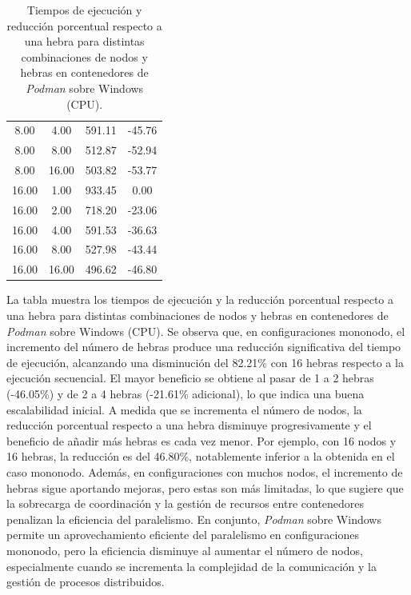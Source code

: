 \begin{table}[ht]
\begin{tabular}{|c|c|c|c|}
        8.00           & 4.00            & 591.11              & -45.76                         \\
        8.00           & 8.00            & 512.87              & -52.94                         \\
        8.00           & 16.00           & 503.82              & -53.77                         \\
        16.00          & 1.00            & 933.45              & 0.00                           \\
        16.00          & 2.00            & 718.20              & -23.06                         \\
        16.00          & 4.00            & 591.53              & -36.63                         \\
        16.00          & 8.00            & 527.98              & -43.44                         \\
        16.00          & 16.00           & 496.62              & -46.80                         \\
        \hline
    \end{tabular}
    \caption{Tiempos de ejecución y reducción porcentual respecto a una hebra para distintas combinaciones de nodos y hebras en contenedores de \textit{Podman} sobre Windows (CPU).}
    \label{tab:thread_sweep_windows_\textit{Podman}_time}
\end{table}

La tabla muestra los tiempos de ejecución y la reducción porcentual respecto a una hebra para distintas combinaciones de nodos y hebras en contenedores de \textit{Podman} sobre Windows (CPU). Se observa que, en configuraciones mononodo, el incremento del número de hebras produce una reducción significativa del tiempo de ejecución, alcanzando una disminución del 82.21\% con 16 hebras respecto a la ejecución secuencial. El mayor beneficio se obtiene al pasar de 1 a 2 hebras (-46.05\%) y de 2 a 4 hebras (-21.61\% adicional), lo que indica una buena escalabilidad inicial. A medida que se incrementa el número de nodos, la reducción porcentual respecto a una hebra disminuye progresivamente y el beneficio de añadir más hebras es cada vez menor. Por ejemplo, con 16 nodos y 16 hebras, la reducción es del 46.80\%, notablemente inferior a la obtenida en el caso mononodo. Además, en configuraciones con muchos nodos, el incremento de hebras sigue aportando mejoras, pero estas son más limitadas, lo que sugiere que la sobrecarga de coordinación y la gestión de recursos entre contenedores penalizan la eficiencia del paralelismo. En conjunto, \textit{Podman} sobre Windows permite un aprovechamiento eficiente del paralelismo en configuraciones mononodo, pero la eficiencia disminuye al aumentar el número de nodos, especialmente cuando se incrementa la complejidad de la comunicación y la gestión de procesos distribuidos.

